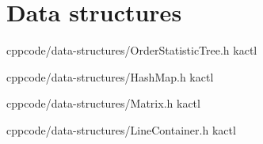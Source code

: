 \chapter{Data structures}

{}{}
{cpp}{code/data-structures/OrderStatisticTree.h}
{kactl}

{}{}
{cpp}{code/data-structures/HashMap.h}
{kactl}

{}{}
{cpp}{code/data-structures/Matrix.h}
{kactl}

{}{}
{cpp}{code/data-structures/LineContainer.h}
{kactl}

